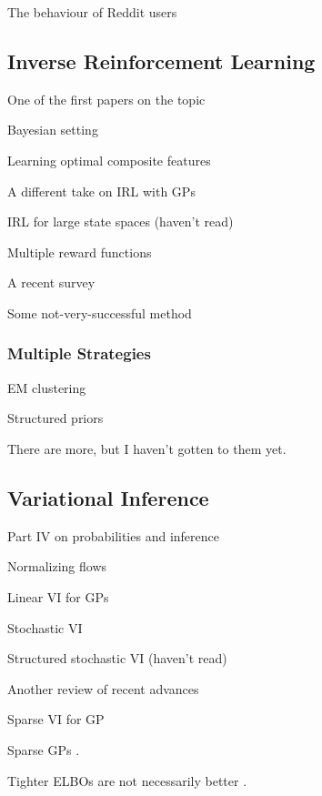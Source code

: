 \documentclass{mprop}
\theoremstyle{definition}
\begin{document}
The behaviour of Reddit users \cite{DBLP:conf/atal/DasL14}

\subsection{Inverse Reinforcement Learning}

One of the first papers on the topic \cite{DBLP:conf/icml/NgR00}

Bayesian setting \cite{DBLP:conf/ijcai/RamachandranA07}

Learning optimal composite features \cite{DBLP:conf/ijcai/ChoiK13}

A different take on IRL with GPs \cite{DBLP:journals/corr/abs-1208-2112}

IRL for large state spaces (haven't read) \cite{DBLP:journals/jmlr/BoulariasKP11}

Multiple reward functions \cite{DBLP:conf/nips/ChoiK12}

A recent survey \cite{DBLP:journals/corr/abs-1806-06877}

Some not-very-successful method \cite{DBLP:conf/uai/NeuS07}

\subsubsection{Multiple Strategies}

EM clustering \cite{DBLP:conf/icml/BabesMLS11}

Structured priors \cite{DBLP:conf/ewrl/DimitrakakisR11}

There are more, but I haven't gotten to them yet.

\subsection{Variational Inference}

Part IV on probabilities and inference \cite{MacKay:2002:ITI:971143}

Normalizing flows \cite{DBLP:conf/icml/RezendeM15}

Linear VI for GPs \cite{DBLP:conf/nips/ChengB17}

Stochastic VI \cite{DBLP:journals/jmlr/HoffmanBWP13}

Structured stochastic VI (haven't read) \cite{DBLP:conf/aistats/HoffmanB15}

Another review of recent advances \cite{DBLP:journals/corr/abs-1711-05597}

Sparse VI for GP \cite{DBLP:journals/jmlr/HensmanDS17}

Sparse GPs \cite{DBLP:journals/jmlr/CandelaR05}.

Tighter ELBOs are not necessarily better \cite{DBLP:conf/icml/RainforthKLMIWT18}.

\cite{DBLP:books/lib/Bishop07}



\end{document}

